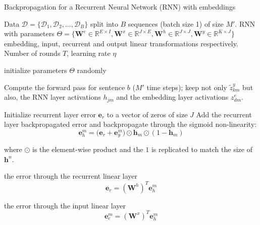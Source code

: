\begin{algorithm}
\caption{Backpropagation for a Recurrent Neural Network (RNN) with embeddings}
\begin{algorithmic}[1]
\label{algo:rnnbackprop}

        Data $\mathcal{D}=\{\mathcal{D}_1,\mathcal{D}_2,...,\mathcal{D}_B\}$ split into $B$ sequences (batch size 1) of size $M'$. RNN with parameters $\Theta=\{\mathbf{W}^e \in \mathbb{R}^{E \times I}, \mathbf{W}^x \in \mathbb{R}^{J \times E}, \mathbf{W}^h \in \mathbb{R}^{J \times J}, \mathbf{W}^y \in \mathbb{R}^{K \times J} \}$ embedding, input, recurrent and output linear transformations respectively. Number of rounds $T$, learning rate $\eta$

   \STATE initialize parameters $\Theta$ randomly


	\vspace{0.3cm}
        \STATE Compute the {forward pass} for sentence $b$ ($M'$ time steps);
        keep not only $\tilde{z}_{km}^y$ but also, the RNN layer activations $h_{jm}$ and the embedding layer activations $z^e_{dm}$.
	\ENDFOR	
	\vspace{0.3cm}

	\ENDFOR	

    \STATE Initialize recurrent layer error $\mathbf{e}_r$ to a vector of zeros of size $J$
	\STATE Add the recurrent layer backpropagated error and backpropagate through the sigmoid non-linearity:
        $$\mathbf{e}^m_{h} = \Big(\mathbf{e}_{r} + \mathbf{e}^m_y\Big) \odot \mathbf{h}_m \odot (\mathbf{\mathrm{1}}-\mathbf{h}_m)$$

	\STATE where $\odot$ is the element-wise product and the $\mathbf{\mathrm{1}}$ is replicated to match the size of $\mathbf{h}^n$.

	 the error through the recurrent linear layer
    $$\mathbf{e}_r = (\mathbf{W}^h)^T \mathbf{e}_h^m$$

	 the error through the input linear layer
    $$\mathbf{e}_e^m = (\mathbf{W}^x)^T \mathbf{e}_h^m$$


\end{algorithmic}
\end{algorithm}
